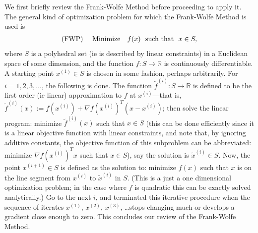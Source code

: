 \documentclass[12pt]{article}
\newcommand{\R}{\mathbb{R}}
\begin{document}
We first briefly review the Frank-Wolfe Method before proceeding
to apply it. The general kind of
 optimization problem for which the Frank-Wolfe Method is used is
  \begin{eqnarray} \label{i} \textup{(FWP)  \ \ \ Minimize}
\ \ \  f(x) \ \textup{   such that   } \
x \in S,
\end{eqnarray}
where $S$ is a polyhedral set (ie is described by linear
constraints) in a Euclidean space of some dimension,
and the function $f:S \rightarrow \R$ is continuously differentiable.
A starting point $x^{(1)} \in S$ is chosen in some fashion,
perhaps arbitrarily. For $i=1,2,3,\ldots$, the following is done.
The function $\tilde{f}^{(i)}:S \rightarrow \R$ is defined to be the
first order (ie linear) approximation to $f$ at $x^{(i)}$---that is,
$\tilde{f}^{(i)}(x):=f(x^{(i)})+\nabla f(x^{(i)})^T(x-x^{(i)})$;
then solve the linear program: minimize $\tilde{f}^{(i)}(x)$ such that $x \in S$
(this can be done efficiently since it is a linear
objective function with linear constraints, and note that, by ignoring additive constants, the objective function of this subproblem can be
abbreviated: minimize $\nabla f(x^{(i)})^Tx$
such that $x \in S$), say the solution is
$\tilde{x}^{(i)} \in S$. Now, the point $x^{(i+1)} \in S$ is defined
as the solution to: minimize $f(x)$ such that $x$ is on the line segment
from $x^{(i)}$ to $\tilde{x}^{(i)}$ in $S$. (This is a just a one dimensional
optimization problem; in the case where $f$ is quadratic this can
be exactly solved analytically.) Go to the next $i$,
and terminated this iterative procedure
when the sequence of iterates $x^{(1)}$, $x^{(2)}$, $x^{(3)}$, \ldots stops
changing much or develops a gradient close enough to zero. This
concludes our review of the Frank-Wolfe Method.
\end{document}
